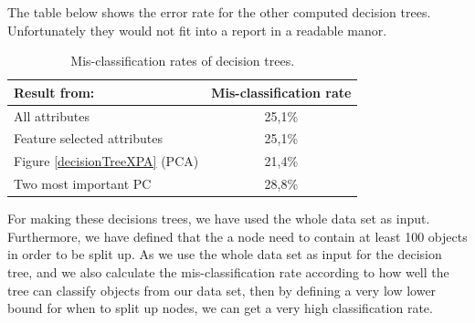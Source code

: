 The table below shows the error rate for the other computed decision trees. Unfortunately they would not fit into a report in a readable manor.
\begin{table}[H]
\begin{longtable}{lc}\hline
Result from: & Mis-classification rate \\ \hline
All attributes & 25,1\% \\ 
Feature selected attributes & 25,1\% \\ 
Figure \ref{decisionTreeXPA} (PCA) & 21,4\% \\ 
Two most important PC & 28,8\% \\ \hline
\end{longtable}
\caption{Mis-classification rates of decision trees.}
\label{decisionTreeErrorRate}
\end{table}

For making these decisions trees, we have used the whole data set as input. Furthermore, we have defined that the a node need to contain at least 100 objects in order to be split up. As we use the whole data set as input for the decision tree, and we also calculate the mis-classification rate according to how well the tree can classify objects from our data set, then by defining a very low lower bound for when to split up nodes, we can get a very high classification rate.
